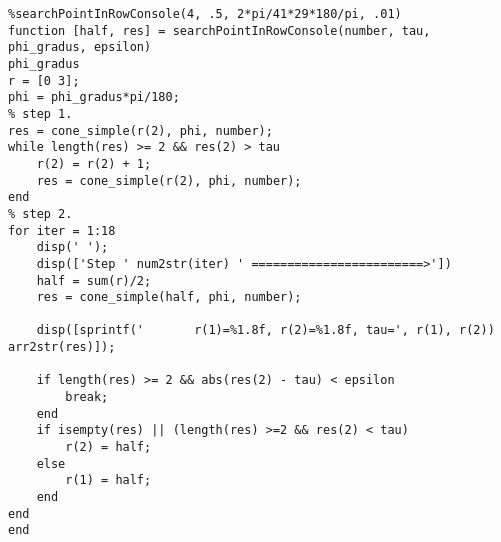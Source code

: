 \begin{verbatim}
%searchPointInRowConsole(4, .5, 2*pi/41*29*180/pi, .01)
function [half, res] = searchPointInRowConsole(number, tau, phi_gradus, epsilon)
phi_gradus
r = [0 3];
phi = phi_gradus*pi/180;
% step 1.
res = cone_simple(r(2), phi, number);
while length(res) >= 2 && res(2) > tau
    r(2) = r(2) + 1;
    res = cone_simple(r(2), phi, number);
end
% step 2.
for iter = 1:18
    disp(' ');
    disp(['Step ' num2str(iter) ' ========================>'])
    half = sum(r)/2;
    res = cone_simple(half, phi, number);

    disp([sprintf('       r(1)=%1.8f, r(2)=%1.8f, tau=', r(1), r(2)) arr2str(res)]);
    
    if length(res) >= 2 && abs(res(2) - tau) < epsilon
        break;
    end
    if isempty(res) || (length(res) >=2 && res(2) < tau)
        r(2) = half;
    else
        r(1) = half;
    end
end
end
\end{verbatim}
